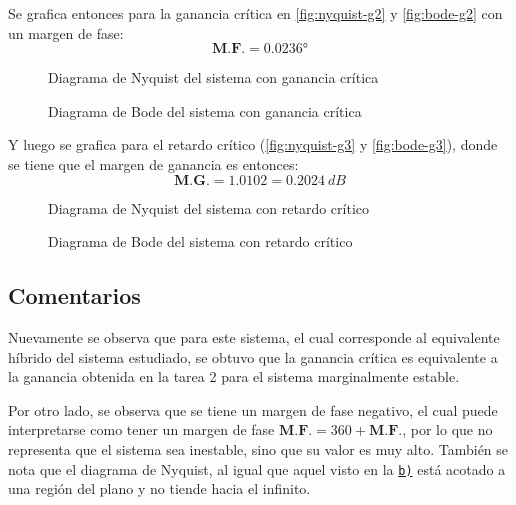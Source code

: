 Se grafica entonces para la ganancia crítica en \autoref{fig:nyquist-g2} y \autoref{fig:bode-g2}
con un margen de fase:
\begin{equation}
  \boxed{\textbf{M.F.} = \ang{0.0236}}
\end{equation}

\begin{figure}[h]
  \centering
  
  \caption{Diagrama de Nyquist del sistema con ganancia crítica}
  \label{fig:nyquist-g2}
\end{figure}

\begin{figure}[h]
  \centering
  
  \caption{Diagrama de Bode del sistema con ganancia crítica}
  \label{fig:bode-g2}
\end{figure}

Y luego se grafica para el retardo crítico (\autoref{fig:nyquist-g3} y
\autoref{fig:bode-g3}), donde se tiene que el margen de ganancia es entonces:
\begin{equation}
  \boxed{\textbf{M.G.} = 1.0102 = 0.2024\ \unit{dB}}
\end{equation}

\begin{figure}[h]
  \centering
  
  \caption{Diagrama de Nyquist del sistema con retardo crítico}
  \label{fig:nyquist-g3}
\end{figure}

\begin{figure}[h]
  \centering
  
  \caption{Diagrama de Bode del sistema con retardo crítico}
  \label{fig:bode-g3}
\end{figure}

\FloatBarrier
\subsection{Comentarios}

Nuevamente se observa que para este sistema, el cual corresponde al equivalente híbrido
del sistema estudiado, se obtuvo que la ganancia crítica es equivalente a la ganancia
obtenida en la tarea 2 \cite{tarea-2-sdc} para el sistema marginalmente estable.

Por otro lado, se observa que se tiene un margen de fase negativo, el cual puede
interpretarse como tener un margen de fase $\textbf{M.F.} = 360 + \textbf{M.F.}$,
por lo que no representa que el sistema sea inestable, sino que su valor es muy
alto. También se nota que el diagrama de Nyquist, al igual que aquel visto en la
\hyperref[pregunta-b]{\texttt{b)}} está acotado a una región del plano y no tiende
hacia el infinito.



